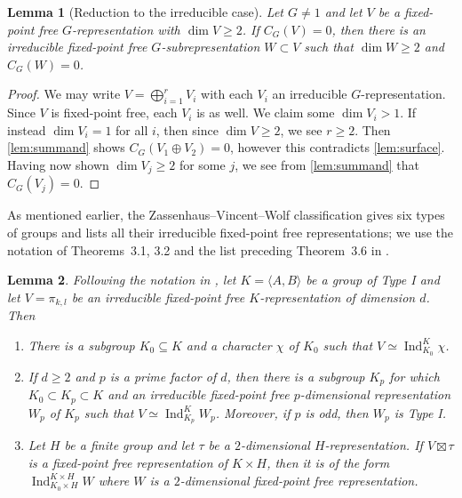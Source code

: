 \documentclass{amsart}
\newtheorem{lemma}[lemma]{Lemma}
\theoremstyle{definition}
\DeclareMathOperator{\Ind}{Ind}
\begin{document}
\begin{lemma}[Reduction to the irreducible case]\label{lem:general->irrep}
Let $G\neq1$ and let $V$ be a fixed-point free $G$-representation with $\dim V\geq2$. If $C_G(V)=0$, then there is an irreducible fixed-point free $G$-subrepresentation $W\subset V$ such that $\dim W\geq2$ and $C_G(W)=0$.
\end{lemma}
\begin{proof}
    We may write $V=\bigoplus_{i=1}^r V_i$ with each $V_i$ an irreducible $G$-representation. Since $V$ is fixed-point free, each $V_i$ is as well. We claim some $\dim V_i>1$. If instead $\dim V_i=1$ for all $i$, then since $\dim V\geq2$, we see $r\geq2$. Then \autoref{lem:summand} shows $C_G(V_1\oplus V_2)=0$, however this contradicts \autoref{lem:surface}. Having now shown $\dim V_j\geq2$ for some $j$, we see from \autoref{lem:summand} that $C_G(V_j)=0$.
\end{proof}

As mentioned earlier, the Zassenhaus--Vincent--Wolf classification gives six types of groups and lists all their irreducible fixed-point free representations; we use the notation of Theorems~3.1, 3.2 and the list preceding Theorem~3.6 in \cite{Stepanov}.



\begin{lemma}\label{lem:TypeI-induction}
Following the notation in \cite[p.~822]{Stepanov}, let $K=\langle A,B\rangle$ be a group of Type I and let $V=\pi_{k,l}$ be an irreducible fixed-point free $K$-representation of dimension $d$. Then
\begin{enumerate}
    \item\label{typeIcharacter} There is a subgroup $K_0\subseteq K$ and a character $\chi$ of $K_0$ such that $V\simeq\Ind_{K_0}^K\chi$.

    \item\label{typeIdimp} If $d\geq2$ and $p$ is a prime factor of $d$, then there is a subgroup $K_p$ for which $K_0\subset K_p\subset K$ and an irreducible fixed-point free $p$-dimensional representation $W_p$ of $K_p$ such that $V\simeq\Ind_{K_p}^K W_p$. Moreover, if $p$ is odd, then $W_p$ is Type I.

    \item\label{boxtimes->2dim} Let $H$ be a finite group and let $\tau$ be a $2$-dimensional $H$-representation. If $V\boxtimes\tau$ is a fixed-point free representation of $K\times H$, then it is of the form $\Ind_{K_0\times H}^{K\times H} W$ where $W$ is a $2$-dimensional fixed-point free representation.
\end{enumerate}
\end{lemma}
\end{document}
